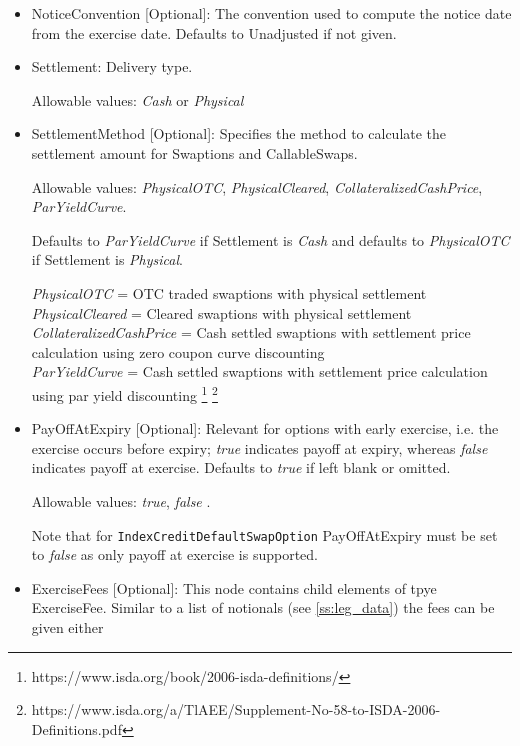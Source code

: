 \begin{itemize}
\item NoticeConvention [Optional]: The convention used to compute the notice date from the exercise date. Defaults to
  Unadjusted if not given.

\item Settlement: Delivery type. 

  Allowable values: \emph{Cash} or \emph{Physical}

\item SettlementMethod [Optional]: Specifies the method to calculate the settlement amount for Swaptions and CallableSwaps.

  Allowable values: \emph{PhysicalOTC}, \emph{PhysicalCleared}, \emph{CollateralizedCashPrice},\\ \emph{ParYieldCurve}. 
  
  Defaults to \emph{ParYieldCurve} if Settlement is \emph{Cash} and defaults to \emph{PhysicalOTC} if Settlement is \emph{Physical}.

\emph{PhysicalOTC} = OTC traded swaptions with physical settlement\\
\emph{PhysicalCleared} = Cleared swaptions with physical settlement\\
\emph{CollateralizedCashPrice} = Cash settled swaptions with settlement price calculation using zero coupon curve discounting \\
\emph{ParYieldCurve}  = Cash settled swaptions with settlement price calculation using par yield discounting \footnote{https://www.isda.org/book/2006-isda-definitions/} \footnote{https://www.isda.org/a/TlAEE/Supplement-No-58-to-ISDA-2006-Definitions.pdf} \\

\item PayOffAtExpiry [Optional]: Relevant for options with early
  exercise, i.e. the exercise occurs before expiry; \emph{true}
  indicates payoff at expiry, whereas \emph{false}  indicates payoff
  at exercise. Defaults to \emph{true}  if left blank or omitted. 

Allowable values: \emph{true}, \emph{false} .

Note that for \lstinline!IndexCreditDefaultSwapOption! PayOffAtExpiry must be set to \emph{false} as only payoff at exercise is supported.


\item ExerciseFees [Optional]: This node contains child elements of tpye ExerciseFee. Similar to a list of notionals
  (see \ref{ss:leg_data}) the fees can be given either


\end{itemize}
